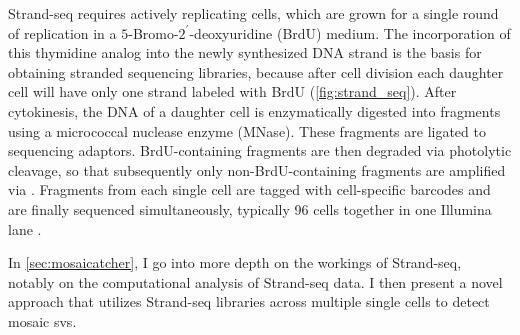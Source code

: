 
Strand-seq requires actively replicating cells, which are grown for a single
round of replication in a $5$-Bromo-$2^\prime$-deoxyuridine (BrdU) medium.
The incorporation of this thymidine analog into the newly synthesized DNA strand
is the basis for obtaining stranded sequencing libraries, because after cell
division each daughter cell will have only one strand labeled with BrdU
(\cref{fig:strand_seq}). After cytokinesis, the DNA of a daughter cell is
enzymatically digested into fragments using a micrococcal nuclease enzyme
(MNase). These fragments are ligated to sequencing adaptors. BrdU-containing
fragments are then degraded via photolytic cleavage, so that
subsequently only non-BrdU-containing fragments are amplified via \pcr.
Fragments from each single cell are tagged with cell-specific barcodes and are
finally sequenced simultaneously, typically 96 cells together in one Illumina
lane \citep{Sanders2017}.

In \cref{sec:mosaicatcher}, I go into more depth on the workings of Strand-seq,
notably on the computational analysis of Strand-seq data. I then present a novel
approach that utilizes Strand-seq libraries across multiple single cells to
detect mosaic \acp{sv}.


